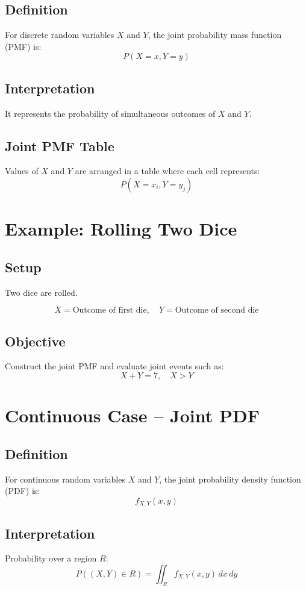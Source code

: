 \documentclass[11pt]{article}
\begin{document}
\subsection{Definition}
For discrete random variables $X$ and $Y$, the joint probability mass function (PMF) is:
\[
P(X = x, Y = y)
\]

\subsection{Interpretation}
It represents the probability of simultaneous outcomes of $X$ and $Y$.

\subsection{Joint PMF Table}
Values of $X$ and $Y$ are arranged in a table where each cell represents:
\[
P(X = x_i, Y = y_j)
\]

\section{Example: Rolling Two Dice}

\subsection{Setup}
Two dice are rolled.

\[
X = \text{Outcome of first die}, \quad Y = \text{Outcome of second die}
\]

\subsection{Objective}
Construct the joint PMF and evaluate joint events such as:
\[
X + Y = 7, \quad X > Y
\]

\section{Continuous Case -- Joint PDF}

\subsection{Definition}
For continuous random variables $X$ and $Y$, the joint probability density function (PDF) is:
\[
f_{X,Y}(x,y)
\]

\subsection{Interpretation}
Probability over a region $R$:
\[
P((X,Y) \in R) = \iint_R f_{X,Y}(x,y)\,dx\,dy
\]
\end{document}
